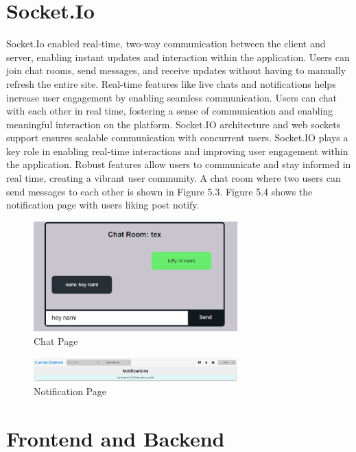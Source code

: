 \section{Socket.Io}
Socket.Io enabled real-time, two-way communication between the client and server, enabling instant updates and interaction within the application. Users can join chat rooms, send messages, and receive updates without having to manually refresh the entire site. Real-time features like live chats and notifications helps increase user engagement by enabling seamless communication. Users can chat with each other in real time, fostering a sense of communication and enabling meaningful interaction on the platform.
Socket.IO architecture and web sockets support ensures scalable communication with concurrent users. Socket.IO plays a key role in enabling real-time interactions and improving user engagement within the application. Robust features allow users to communicate and stay informed in real time, creating a vibrant user community. A chat room where two users can send messages to each other is shown in Figure 5.3. Figure 5.4 shows the notification page with users liking post notify.

\begin{figure}[h!]
    \centering
    \includegraphics[width=0.7\textwidth]{images/chatroom.PNG}
    \caption{Chat Page}
    \label{fig:chat-rooms}
\end{figure}

\begin{figure}[h!]
    \centering
    \includegraphics[width=0.7\textwidth]{images/notify.PNG}
    \caption{Notification Page}
    \label{fig:like-notify}
\end{figure}

\section{Frontend and Backend}
